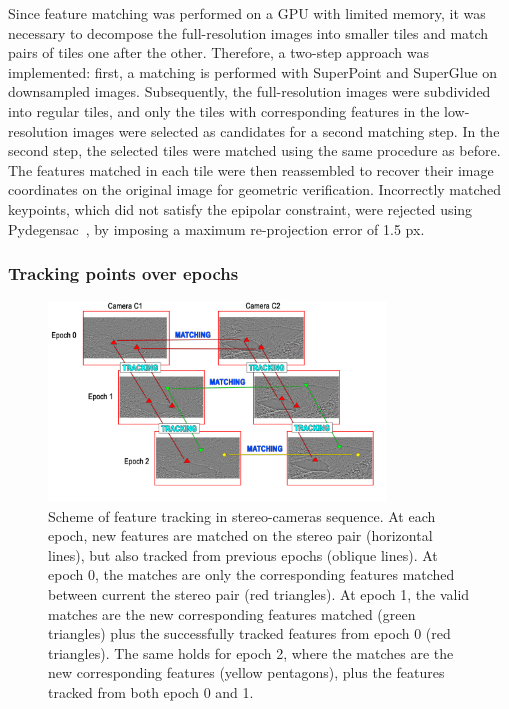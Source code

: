 Since feature matching was performed on a GPU with limited memory, it was necessary to decompose the full-resolution images into smaller tiles and match pairs of tiles one after the other.
Therefore, a two-step approach was implemented: first, a matching is performed with SuperPoint and SuperGlue on downsampled images. Subsequently, the
full-resolution images were subdivided into regular tiles, and only the tiles with corresponding features in the low-resolution images were selected as candidates for a second matching step.
In the second step, the selected tiles were matched using the same procedure as before.
The features matched in each tile were then reassembled to recover their image coordinates on the original image for geometric verification.
Incorrectly matched keypoints, which did not satisfy the epipolar constraint, were rejected using Pydegensac~\citep{Mishkin2015_pydegensac}, by imposing a maximum re-projection error of 1.5 px.

\subsubsection{Tracking points over epochs}\label{sec:4:tracking}

\begin{figure}[ht]
  \centering
  \includegraphics[width=0.8\textwidth]{3_tracking.png}
  \caption{Scheme of feature tracking in stereo-cameras sequence. At each epoch, new
    features are matched on the stereo pair (horizontal lines), but also tracked from
    previous epochs (oblique lines).
    At epoch 0, the matches are only the corresponding features matched
    between	current the stereo pair (red triangles).
    At epoch 1, the valid matches are the new corresponding features matched (green
    triangles) plus the successfully tracked features from epoch 0 (red triangles).
    The same holds for epoch 2, where the matches are the new
    corresponding features (yellow pentagons), plus the features tracked from both epoch
    0 and 1.}
  \label{fig:4:tracking}
\end{figure}

